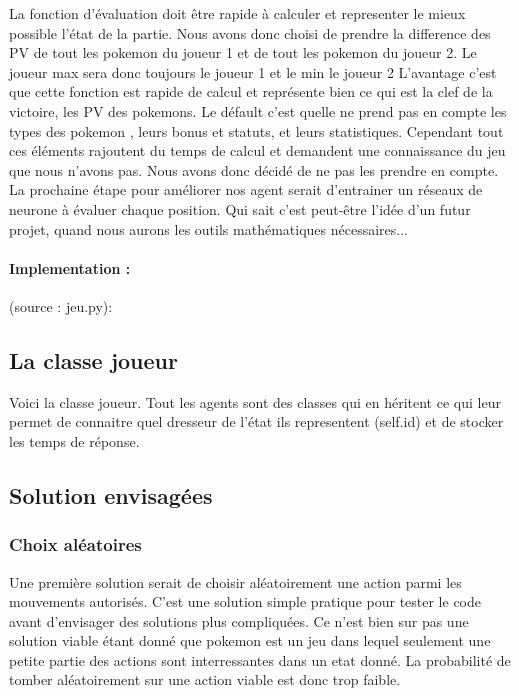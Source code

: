 		La fonction d'évaluation doit être rapide à calculer et representer le mieux possible l'état de la partie. Nous avons donc choisi de prendre la difference des PV de tout les 					pokemon du joueur 1 et de tout les pokemon du joueur 2.
		Le joueur max sera donc toujours le joueur 1 et le min le joueur 2 L'avantage c'est que cette fonction est rapide de calcul et 				représente bien ce qui est la clef de la victoire, les PV des pokemons.
		Le défault c'est quelle ne prend pas en compte les types des pokemon , leurs bonus et statuts, et leurs statistiques. Cependant tout ces éléments rajoutent du temps de 					calcul et demandent une connaissance du jeu que nous n'avons pas. Nous avons donc décidé de ne pas les prendre en compte.
		La prochaine étape pour améliorer nos agent serait d'entrainer un réseaux de neurone à évaluer chaque position. Qui sait c'est peut-être l'idée d'un futur projet, quand nous aurons les outils mathématiques nécessaires...
		\smallskip
		\paragraph{Implementation :}
		    (source : jeu.py): 
			
    \subsection{La classe joueur}
        Voici la classe joueur. Tout les agents sont des classes qui en héritent ce qui leur permet de connaitre quel dresseur de l'état ils representent (self.id) et de stocker les temps de réponse.
        
        
	\subsection{Solution envisagées}
		\subsubsection{Choix aléatoires}
			Une première solution serait de choisir aléatoirement une action parmi les mouvements autorisés. C'est une solution simple pratique pour tester le code avant 						d'envisager des solutions plus compliquées. Ce n'est bien sur pas une solution viable étant donné que pokemon est un jeu dans lequel seulement une petite partie 						des actions sont interressantes dans un etat donné. La probabilité de tomber aléatoirement sur une action viable est donc trop faible.
